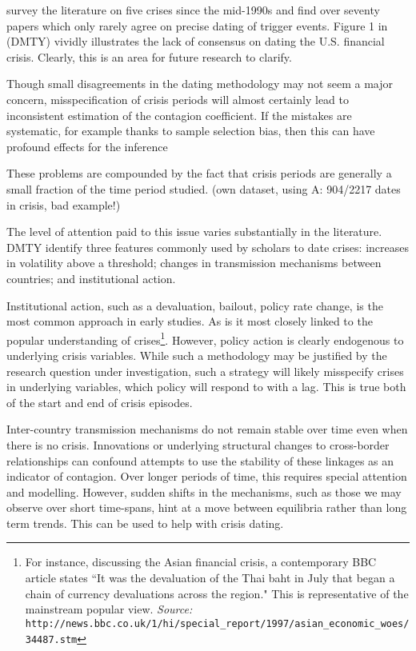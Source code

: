 \documentclass[../base.tex]{subfiles}
\begin{document}
\cite{fry2011actually} survey the literature on five crises since the mid-1990s and find over seventy papers which only rarely agree on precise dating of trigger events. Figure 1 in  \cite{dungey2015endogenous} (DMTY) vividly illustrates the lack of consensus on dating the U.S. financial crisis. Clearly, this is an area for future research to clarify.

Though small disagreements in the dating methodology may not seem a major concern, misspecification of crisis periods will almost certainly lead to inconsistent estimation of the contagion coefficient. If the mistakes are systematic, for example thanks to sample selection bias, then this can have profound effects for the inference 

These problems are compounded by the fact that crisis periods are generally a small fraction of the time period studied. (own dataset, using A: 904/2217 dates in crisis, bad example!)

The level of attention paid to this issue varies substantially in the literature. DMTY identify three  features commonly used by scholars to date crises: increases in volatility above a threshold; changes in transmission mechanisms between countries; and institutional action.

Institutional action, such as a devaluation, bailout, policy rate change, is the most common approach in early studies. As is it most closely linked to the popular understanding of crises\footnote{For instance, discussing the Asian financial crisis, a contemporary BBC article states ``It was the devaluation of the Thai baht in July that began a chain of currency devaluations across the region." This is representative of the mainstream popular view.
\textit{Source:} \texttt{http://news.bbc.co.uk/1/hi/special\_report/1997/asian\_economic\_woes/34487.stm}}. However, policy action is clearly endogenous to underlying crisis variables. While such a methodology may be justified by the research question under investigation, such a strategy will likely misspecify crises in underlying variables, which policy will respond to with a lag. This is true both of the start and end of crisis episodes. 

Inter-country transmission mechanisms do not remain stable over time even when there is no crisis. Innovations or underlying structural changes to cross-border relationships can confound attempts to use the stability of these linkages as an indicator of contagion. Over longer periods of time, this requires special attention and modelling. However, sudden shifts in the mechanisms, such as those we may observe over short time-spans, hint at a move between equilibria rather than long term trends. This can be used to help with crisis dating.
\end{document}
